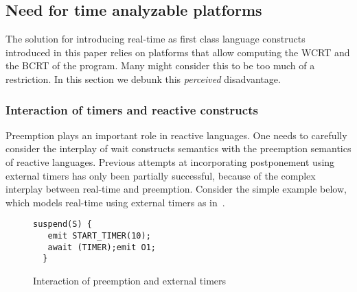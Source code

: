 \subsection{Need for time analyzable platforms}
\label{sec:need-time-analyzable}

The solution for introducing real-time as first class language
constructs introduced in this paper relies on platforms that allow
computing the WCRT and the BCRT of the program. Many might consider this
to be too much of a restriction. In this section we debunk this
\textit{perceived} disadvantage.

\subsubsection{Interaction of timers and reactive constructs}
\label{sec:inter-timers-react}


Preemption plays an important role in reactive languages. One needs to
carefully consider the interplay of wait constructs semantics with the
preemption semantics of reactive languages. Previous attempts at
incorporating postponement using external timers has only been partially
successful, because of the complex interplay between real-time and
preemption. Consider the simple example below, which models real-time
using external timers as in~\cite{rsh94}.

\begin{figure}[h!]
  \centering
	\vspace{-10pt}
		\begin{lstlisting}[style=sysj,basicstyle=\footnotesize\ttfamily,morekeywords={emit,trap,pause,exit,delay,suspend}]
  suspend(S) {
   emit START_TIMER(10); 
   await (TIMER);emit O1;
  }
		\end{lstlisting}
  \caption{Interaction of preemption and external timers}
  \label{fig:preemp}
	\vspace{-10pt}
\end{figure}

